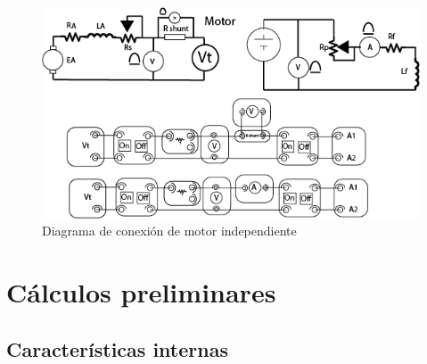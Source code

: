 \documentclass[11pt,letterpaper]{article}     %
\begin{document}
\begin{figure}[H]
    \centering
    \includegraphics[scale=0.5]{./recursos-Lab6/diagMotorIndependient.png}
    \caption{Diagrama de conexión de motor independiente}
    \label{fig:diagMotorIndependiente}
\end{figure}
\section{Cálculos preliminares}
\subsection{Características internas}
\end{document}
